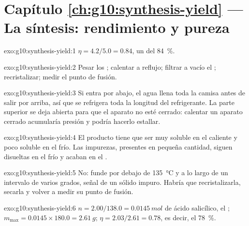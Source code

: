 \section*{Capítulo \ref{ch:g10:synthesis-yield} --- La síntesis: rendimiento y pureza}

\begin{solution}{exo:g10:synthesis-yield:1}
$\eta = 4.2 / 5.0 = 0.84$, un  del \qty{84}{\percent}.
\end{solution}

\begin{solution}{exo:g10:synthesis-yield:2}
Pesar los ; calentar a reflujo; filtrar a vacío el ; recristalizar; medir el punto de fusión.
\end{solution}

\begin{solution}{exo:g10:synthesis-yield:3}
Si entra por abajo, el agua llena toda la camisa antes de salir por
arriba, así que se refrigera toda la longitud del refrigerante. La parte
superior se deja abierta para que el aparato no esté cerrado: calentar
un aparato cerrado acumularía presión y podría hacerlo estallar.
\end{solution}

\begin{solution}{exo:g10:synthesis-yield:4}
El producto tiene que ser muy soluble en el  caliente y poco
soluble en el  frío. Las impurezas, presentes en pequeña
cantidad, siguen disueltas en el  frío y acaban en el .
\end{solution}

\begin{solution}{exo:g10:synthesis-yield:5}
No: funde por debajo de \qty{135}{\celsius} y a lo largo de un intervalo
de varios grados, señal de un sólido impuro. Habría que recristalizarla,
secarla y volver a medir su punto de fusión.
\end{solution}

\begin{solution}{exo:g10:synthesis-yield:6}
$n = 2.00 / 138.0 = \qty{0.0145}{mol}$ de ácido salicílico, el ; $m_{\max} = 0.0145 \times 180.0 = \qty{2.61}{g}$;
$\eta = 2.03 / 2.61 = 0.78$, es decir, el \qty{78}{\percent}.
\end{solution}

